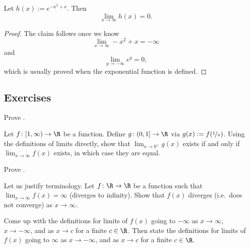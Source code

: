 \documentclass[12pt]{book}
\begin{document}
\begin{example}
Let $h(x) := e^{-x^2+x}$.
Then
\begin{equation*}
\lim_{x\to \infty} h(x) = 0 .
\end{equation*}

\begin{proof}
The claim follows once we know
\begin{equation*}
\lim_{x\to \infty} -x^2+x = -\infty
\end{equation*}
and
\begin{equation*}
\lim_{y\to -\infty} e^y = 0 ,
\end{equation*}
which is usually proved when the exponential function is defined.
\end{proof}
\end{example}

\subsection*{Exercises}

\begin{exercise}
Prove .
\end{exercise}

\begin{exercise}
Let $f \colon [1,\infty) \to \R$ be a function.
Define
$g \colon (0,1] \to \R$ via $g(x) := f(\nicefrac{1}{x})$.
Using the definitions of limits directly,
show that $\lim_{x\to 0^+} g(x)$
exists if and only if $\lim_{x\to \infty} f(x)$ exists, in which
case they are equal.
\end{exercise}

\begin{exercise}
Prove .
\end{exercise}

\begin{exercise}
Let us justify terminology.
Let $f \colon \R \to \R$ be a function such that
$\lim_{x \to \infty} f(x) = \infty$ (diverges to infinity).
Show that $f(x)$ diverges (i.e.\ does not converge) as $x \to \infty$.
\end{exercise}

\begin{exercise}
Come up with the definitions for limits of $f(x)$ going to $-\infty$ as $x \to
\infty$, $x \to -\infty$, and as $x \to c$ for a finite $c \in \R$.
Then state the definitions for limits of $f(x)$ going to $\infty$ 
as $x \to -\infty$, and as $x \to c$ for a finite $c \in \R$.
\end{exercise}
\end{document}
